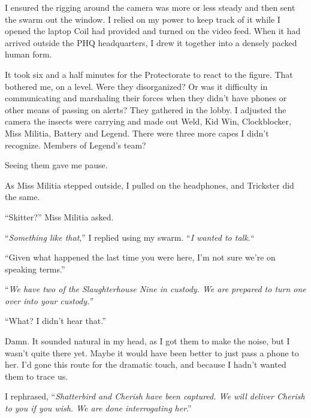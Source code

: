 I ensured the rigging around the camera was more or less steady and then sent the swarm out the window.  I relied on my power to keep track of it while I opened the laptop Coil had provided and turned on the video feed.  When it had arrived outside the PHQ headquarters, I drew it together into a densely packed human form.



It took six and a half minutes for the Protectorate to react to the figure.  That bothered me, on a level.  Were they disorganized?  Or was it difficulty in communicating and marshaling their forces when they didn't have phones or other means of passing on alerts?  They gathered in the lobby.  I adjusted the camera the insects were carrying and made out Weld, Kid Win, Clockblocker, Miss Militia, Battery and Legend.  There were three more capes I didn't recognize.  Members of Legend's team?



Seeing them gave me pause.



As Miss Militia stepped outside, I pulled on the headphones, and Trickster did the same.



``Skitter?'' Miss Militia asked.



``\emph{Something like that},'' I replied using my swarm.  ``\emph{I wanted to talk.}``



``Given what happened the last time you were here, I'm not sure we're on speaking terms.''



``\emph{We have two of the Slaughterhouse Nine in custody.  We are prepared to turn one over into your custody.''}



``What?  I didn't hear that.''



Damn.  It sounded natural in my head, as I got them to make the noise, but I wasn't quite there yet.  Maybe it would have been better to just pass a phone to her.  I'd gone this route for the dramatic touch, and because I hadn't wanted them to trace us.



I rephrased, ``\emph{Shatterbird and Cherish have been captured.  We will deliver Cherish to you if you wish}\emph{.  We are done interrogating her}.''



